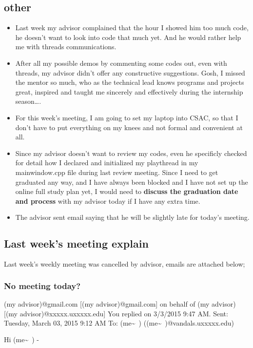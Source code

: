 \documentclass[9pt,b5paper]{article}
\begin{document}
\subsection{other}
\label{sec-3-2}
\begin{itemize}
\item Last week my advisor complained that the hour I showed him too much code, he doesn't want to look into code that much yet. And he would rather help me with threads communications.
\item After all my possible demos by commenting some codes out, even with threads, my advisor didn't offer any constructive suggestions. Gosh, I missed the mentor so much, who as the technical lead knows programs and projects great, inspired and taught me sincerely and effectively during the internship season\ldots{}.
\item For this week's meeting, I am going to set my laptop into CSAC, so that I don't have to put everything on my knees and not formal and convenient at all.
\item Since my advisor doesn't want to review my codes, even he specificly checked for detail how I declared and initialized my playthread in my mainwindow.cpp file during last review meeting. Since I need to get graduated any way, and I have always been blocked and I have not set up the online full study plan yet, I would need to \textbf{discuss the graduation date and process} with my advisor today if I have any extra time.
\item The advisor sent email saying that he will be slightly late for today's meeting.
\end{itemize}
\subsection{Last week's meeting explain}
\label{sec-3-3}
Last week's weekly meeting was cancelled by advisor, emails are attached below;

\subsubsection{No meeting today?}
\label{sec-3-3-1}
(my advisor)@gmail.com [(my advisor)@gmail.com] on behalf of (my advisor) [(my advisor)@xxxxx.uxxxxx.edu]
You replied on 3/3/2015 9:47 AM.
Sent:        Tuesday, March 03, 2015 9:12 AM
To:        (me\textasciitilde{}~) ((me\textasciitilde{}~)@vandals.uxxxxx.edu)

Hi (me\textasciitilde{}~) - 
\end{document}
